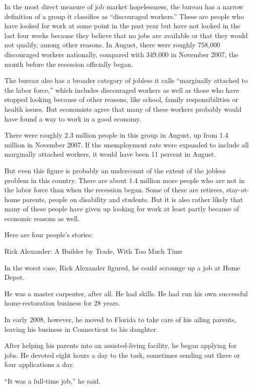﻿\documentclass[12pt]{article}
\begin{document}
In the most direct measure of job market hopelessness, the bureau has a narrow definition of a group
it classifies as ``discouraged workers.'' These are people who have looked for work at some point in
the past year but have not looked in the last four weeks because they believe that no jobs are
available or that they would not qualify, among other reasons. In August, there were roughly 758,000
discouraged workers nationally, compared with 349,000 in November 2007, the month before the
recession officially began.

The bureau also has a broader category of jobless it calls ``marginally attached to the labor
force,'' which includes discouraged workers as well as those who have stopped looking because of
other reasons, like school, family responsibilities or health issues. But economists agree that many
of these workers probably would have found a way to work in a good economy.

There were roughly 2.3 million people in this group in August, up from 1.4 million in November 2007.
If the unemployment rate were expanded to include all marginally attached workers, it would have
been 11 percent in August.

But even this figure is probably an undercount of the extent of the jobless problem in this country.
There are about 1.4 million more people who are not in the labor force than when the recession
began. Some of these are retirees, stay-at-home parents, people on disability and students. But it
is also rather likely that many of these people have given up looking for work at least partly
because of economic reasons as well.

Here are four people's stories:

Rick Alexander: A Builder by Trade, With Too Much Time

In the worst case, Rick Alexander figured, he could scrounge up a job at Home Depot.

He was a master carpenter, after all. He had skills. He had run his own successful home-restoration
business for 28 years.

In early 2008, however, he moved to Florida to take care of his ailing parents, leaving his business
in Connecticut to his daughter.

After helping his parents into an assisted-living facility, he began applying for jobs. He devoted
eight hours a day to the task, sometimes sending out three or four applications a day.

``It was a full-time job,'' he said.
\end{document}
